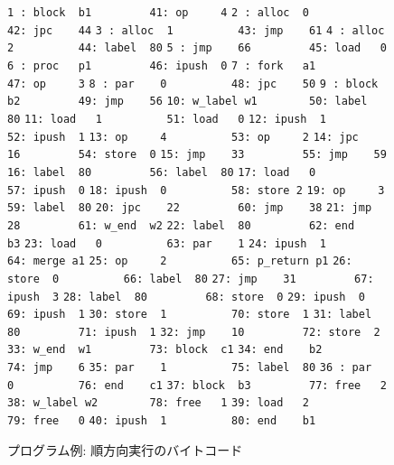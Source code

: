 \documentclass[submit,PRO]{ipsj}
\def\|{\verb|}
\begin{document}
\begin{figure}[tb]
\vbox{
\hbox{\|1 : block  b1         41: op     4|}
\hbox{\|2 : alloc  0          42: jpc    44|}
\hbox{\|3 : alloc  1          43: jmp    61|}
\hbox{\|4 : alloc  2          44: label  80|}
\hbox{\|5 : jmp    66         45: load   0|}
\hbox{\|6 : proc   p1         46: ipush  0|}
\hbox{\|7 : fork   a1         47: op     3|}
\hbox{\|8 : par    0          48: jpc    50|}
\hbox{\|9 : block  b2         49: jmp    56|}
\hbox{\|10: w_label w1        50: label  80|}
\hbox{\|11: load   1          51: load   0|}
\hbox{\|12: ipush  1          52: ipush  1|}
\hbox{\|13: op     4          53: op     2|}
\hbox{\|14: jpc    16         54: store  0|}
\hbox{\|15: jmp    33         55: jmp    59|}
\hbox{\|16: label  80         56: label  80|}
\hbox{\|17: load   0          57: ipush  0|}
\hbox{\|18: ipush  0          58: store 2|}
\hbox{\|19: op     3          59: label  80|}
\hbox{\|20: jpc    22         60: jmp    38|}
\hbox{\|21: jmp    28         61: w_end  w2|}
\hbox{\|22: label  80         62: end    b3|}
\hbox{\|23: load   0          63: par    1|}
\hbox{\|24: ipush  1          64: merge a1|}
\hbox{\|25: op     2          65: p_return p1|}
\hbox{\|26: store  0          66: label  80|}
\hbox{\|27: jmp    31         67: ipush  3|}
\hbox{\|28: label  80         68: store  0|}
\hbox{\|29: ipush  0          69: ipush  1|}
\hbox{\|30: store  1          70: store  1|}
\hbox{\|31: label  80         71: ipush  1|}
\hbox{\|32: jmp    10         72: store  2|}
\hbox{\|33: w_end  w1         73: block  c1|}
\hbox{\|34: end    b2         74: jmp    6|}
\hbox{\|35: par    1          75: label  80|}
\hbox{\|36 : par   0          76: end    c1|}
\hbox{\|37: block  b3         77: free   2|}
\hbox{\|38: w_label w2        78: free   1|}
\hbox{\|39: load   2          79: free   0|}
\hbox{\|40: ipush  1          80: end    b1|}
}
\centerline{}
\caption{プログラム例: 順方向実行のバイトコード}
\label{fig:bytecode}
\end{figure}
\end{document}
